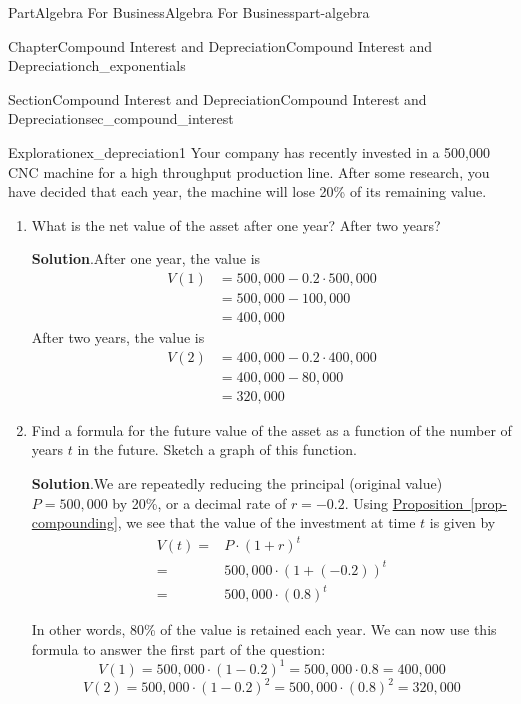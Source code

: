 \documentclass[oneside,10pt,]{tufte-book}
\newcommand{\blocktitlefont}{\relax}
\newcommand{\xreffont}{\relax}
\numberwithin{equation}{chapter}
\newcommand{\amp}{&}
\begin{document}
\begin{partptx}{Part}{Algebra For Business}{}{Algebra For Business}{}{}{part-algebra}
\begin{chapterptx}{Chapter}{Compound Interest and Depreciation}{}{Compound Interest and Depreciation}{}{}{ch_exponentials}
\begin{sectionptx}{Section}{Compound Interest and Depreciation}{}{Compound Interest and Depreciation}{}{}{sec_compound_interest}
\begin{exploration}{Exploration}{}{ex_depreciation1}
Your company has recently invested in a \textdollar{}500,000 CNC machine for a high throughput production line. After some research, you have decided that each year, the machine will lose 20\% of its remaining value.%
\begin{enumerate}[font=\bfseries,label=(\alph*),ref=\alph*]%
\item{}What is the net value of the asset after one year?  After two years?%
\par\smallskip%
\noindent\textbf{\blocktitlefont Solution}.\hypertarget{ex_depreciation1-2-2}{}\quad{}After one year, the value is%
\begin{align*}
V(1) \amp = 500,000 - 0.2\cdot 500,000\\
\amp = 500,000 - 100,000\\
\amp = 400,000 
\end{align*}
After two years, the value is%
\begin{align*}
V(2) \amp = 400,000 - 0.2\cdot 400,000\\
\amp = 400,000 - 80,000\\
\amp = 320,000 
\end{align*}
%
\item{}Find a formula for the future value of the asset as a function of the number of years \(t\) in the future. Sketch a graph of this function.%
\par\smallskip%
\noindent\textbf{\blocktitlefont Solution}.\hypertarget{ex_depreciation1-3-2}{}\quad{}We are repeatedly reducing the principal (original value) \(P=500,000\) by 20\%, or a decimal rate of \(r= -0.2\). Using \hyperref[prop-compounding]{Proposition~{\xreffont\ref{prop-compounding}}}, we see that the value of the investment at time \(t\) is given by%
\begin{align*}
V(t) = \amp  P\cdot (1 + r)^t \\
= \amp 500,000\cdot (1 + (-0.2))^t \\
= \amp 500,000\cdot (0.8)^t 
\end{align*}
%
\par
In other words, 80\% of the value is retained each year.  We can now use this formula to answer the first part of the question:%
\begin{equation*}
V(1) = 500,000 \cdot ( 1 - 0.2 )^1 = 500,000 \cdot 0.8 = 400,000
\end{equation*}
%
\begin{equation*}
V(2) = 500,000 \cdot ( 1 - 0.2 )^2 = 500,000 \cdot (0.8)^2 = 320,000
\end{equation*}

\end{enumerate}
\end{exploration}
\end{sectionptx}
\end{chapterptx}
\end{partptx}
\end{document}
